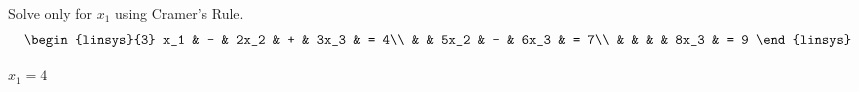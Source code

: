 
\begin{Exercise}[
name={},
title={}, 
difficulty=0,
origin={\cite{YL}}]
Solve only for $x_1$ using Cramer's Rule.
\[
\begin{linsys}{3}
x_1 & - & 2x_2 & +  & 3x_3 & = 4\\
   &   & 5x_2 & -  & 6x_3 & = 7\\
   &   &      &    & 8x_3 & = 9
\end{linsys}
\]
\end{Exercise}

\begin{Answer}
$x_1=4$

\end{Answer}
